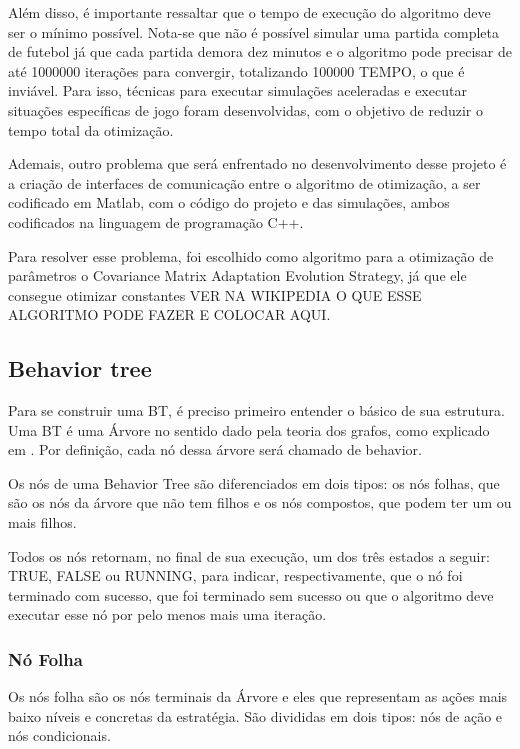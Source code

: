 \documentclass[a4paper,12pt]{article}
\begin{document}
Além disso, é importante ressaltar que o tempo de execução do algoritmo deve ser o mínimo possível. Nota-se que não é possível simular uma partida completa de futebol já que cada partida demora dez minutos e o algoritmo pode precisar de até 1000000 iterações para convergir, totalizando 100000 TEMPO, o que é inviável. Para isso, técnicas para executar simulações aceleradas e executar situações específicas de jogo foram desenvolvidas, com o objetivo de reduzir o tempo total da otimização.

Ademais, outro problema que será enfrentado no desenvolvimento desse projeto é a criação de interfaces de comunicação entre o algoritmo de otimização, a ser codificado em Matlab, com o código do projeto e das simulações, ambos codificados na linguagem de programação C++.

Para resolver esse problema, foi escolhido como algoritmo para a otimização de parâmetros o Covariance Matrix Adaptation Evolution Strategy, já que ele consegue otimizar constantes VER NA WIKIPEDIA O QUE ESSE ALGORITMO PODE FAZER E COLOCAR AQUI.

\subsection{Behavior tree}

Para se construir uma BT, é preciso primeiro entender o básico de sua estrutura. Uma BT é uma Árvore no sentido dado pela teoria dos grafos, como explicado em \cite{west2001introduction}. Por definição, cada nó dessa árvore será chamado de behavior.

Os nós de uma Behavior Tree são diferenciados em dois tipos: os nós folhas, que são os nós da árvore que não tem filhos e os nós compostos, que podem ter um ou mais filhos.

Todos os nós retornam, no final de sua execução, um dos três estados a seguir: TRUE, FALSE ou RUNNING, para indicar, respectivamente, que o nó foi terminado com sucesso, que foi terminado sem sucesso ou que o algoritmo deve executar esse nó por pelo menos mais uma iteração.

\subsubsection{Nó Folha}

Os nós folha são os nós terminais da Árvore e eles que representam as ações mais baixo níveis e concretas da estratégia. São divididas em dois tipos: nós de ação e nós condicionais.
\end{document}
